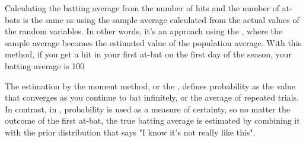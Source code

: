 \documentclass{ltjsbook}
\begin{document}
Calculating the batting average from the number of hits and the number of at-bats is the same as using the sample average calculated from the actual values of the random variables. In other words, it's an approach using the , where the sample average becomes the estimated value of the population average. With this method, if you get a hit in your first at-bat on the first day of the season, your batting average is 100%

The estimation by the moment method, or the , defines probability as the value that converges as you continue to bat infinitely, or the average of repeated trials. In contrast, in , probability is used as a measure of certainty, so no matter the outcome of the first at-bat, the true batting average is estimated by combining it with the prior distribution that says "I know it's not really like this".
\end{document}
